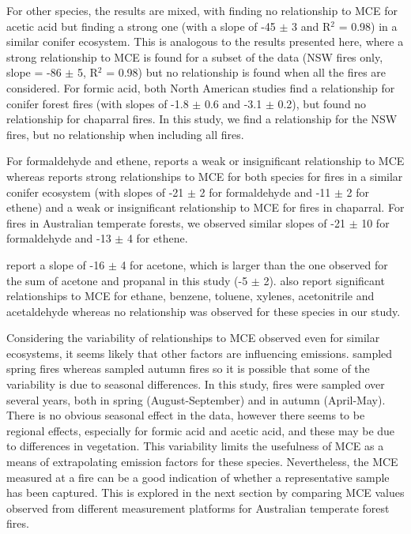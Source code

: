 \documentclass[acp, manuscript]{copernicus}
\begin{document}
For other species, the results are mixed, with \citet{Akagi2013} finding no relationship to MCE for acetic acid but \citet{Burling2011} finding a strong one (with a slope of -45 $\pm$ 3 and R$^2$ = 0.98) in a similar conifer ecosystem. This is analogous to the results presented here, where a strong relationship to MCE is found for a subset of the data (NSW fires only, slope = -86 $\pm$ 5, R$^2$ = 0.98) but no relationship is found when all the fires are considered. 
For formic acid, both North American studies find a relationship for conifer forest fires (with slopes of -1.8 $\pm$ 0.6 and -3.1 $\pm$ 0.2), but \citet{Burling2011} found no relationship for chaparral fires. In this study, we find a relationship for the NSW fires, but no relationship when including all fires. 

For formaldehyde and ethene, \citet{Akagi2013} reports a weak or insignificant relationship to MCE whereas \citet{Burling2011} reports strong relationships to MCE for both species for fires in a similar conifer ecosystem (with slopes of -21 $\pm$ 2 for formaldehyde and -11 $\pm$ 2 for ethene) and a weak or insignificant relationship to MCE for fires in chaparral. For fires in Australian temperate forests, we observed similar slopes of -21 $\pm$ 10 for formaldehyde and -13 $\pm$ 4 for ethene. 

\citet{Akagi2013} report a slope of -16 $\pm$ 4 for acetone, which is larger than the one observed for the sum of acetone and propanal in this study (-5 $\pm$ 2). \citet{Akagi2013} also report significant relationships to MCE for ethane, benzene, toluene, xylenes, acetonitrile and acetaldehyde whereas no relationship was observed for these species in our study.
   
Considering the variability of relationships to MCE observed even for similar ecosystems, it seems likely that other factors are influencing emissions. %
\citet{Burling2011} sampled spring fires whereas \citet{Akagi2013} sampled autumn fires so it is possible that some of the variability is due to seasonal differences. In this study, fires were sampled over several years, both in spring (August-September) and in autumn (April-May). There is no obvious seasonal effect in the data, however there seems to be regional effects, especially for formic acid and acetic acid, and these may be due to differences in vegetation.   
This variability limits the usefulness of MCE as a means of extrapolating emission factors for these species. Nevertheless, the MCE measured at a fire can be a good indication of whether a representative sample has been captured. This is explored in the next section by comparing MCE values observed from different measurement platforms for Australian temperate forest fires. 
\end{document}
